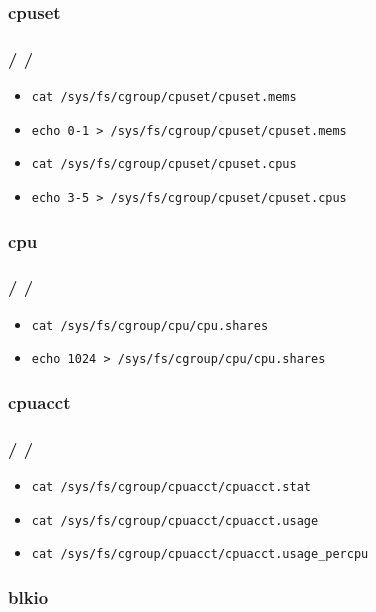 \documentclass{beamer}
\newcommand{\autotitle}
{\frametitle{
    \secname
    \ifx\insertsubsection\empty
    \else
        /\subsecname
        \ifx\insertsubsubsection\empty\else/\subsubsecname\fi
    \fi}}
\begin{document}
\subsubsection{cpuset}

\begin{frame}[fragile]
    \autotitle
    \begin{itemize}
        \item \verb|cat /sys/fs/cgroup/cpuset/cpuset.mems|
        \item \verb|echo 0-1 > /sys/fs/cgroup/cpuset/cpuset.mems|
        \item \verb|cat /sys/fs/cgroup/cpuset/cpuset.cpus|
        \item \verb|echo 3-5 > /sys/fs/cgroup/cpuset/cpuset.cpus|
    \end{itemize}
\end{frame}

\subsubsection{cpu}

\begin{frame}[fragile]
    \autotitle
    \begin{itemize}
        \item \verb|cat /sys/fs/cgroup/cpu/cpu.shares|
        \item \verb|echo 1024 > /sys/fs/cgroup/cpu/cpu.shares|
    \end{itemize}
\end{frame}

\subsubsection{cpuacct}

\begin{frame}[fragile]
    \autotitle
    \begin{itemize}
        \item \verb|cat /sys/fs/cgroup/cpuacct/cpuacct.stat|
        \item \verb|cat /sys/fs/cgroup/cpuacct/cpuacct.usage|
        \item \verb|cat /sys/fs/cgroup/cpuacct/cpuacct.usage_percpu|
    \end{itemize}
\end{frame}

\subsubsection{blkio}
\end{document}
